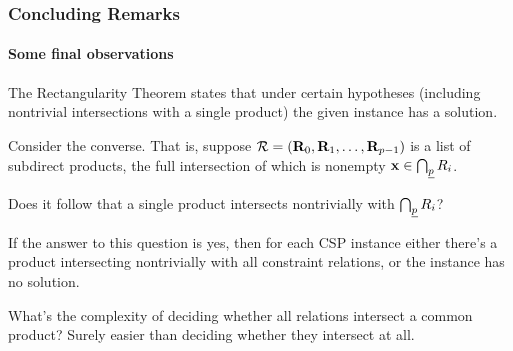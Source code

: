 \documentclass[xcolor=dvipsnames,9pt,hide notes,mathserif]{beamer}
\newcommand{\csp}{\acs{CSP}\xspace}
\begin{document}
\begin{frame} \frametitle{Concluding Remarks}
 \framesubtitle{Some final observations}

  The Rectangularity Theorem states that under certain hypotheses (including nontrivial
  intersections with a single \mas product) the given instance has a solution.

  \bigskip

  Consider the converse.  That is, suppose
  $\mathcal{R} = (\mathbf{R}_0, \mathbf{R}_1,\dots, \mathbf{R}_{p-1})$ is a list of subdirect products,
  the full intersection of which is nonempty $\mathbf{x} \in \bigcap_{\underline{p}} R_i$.
  
  \bigskip

  Does it follow that a single \mas product intersects nontrivially with
  $\bigcap_{\underline{p}} R_i$?

  \bigskip
  
  If the answer to this question is yes, then for each \csp instance either
  there's a \mas product intersecting nontrivially with 
  all constraint relations, or the instance has no solution.

  \bigskip
  What's the complexity of deciding whether all relations intersect a common
  \mas product?  Surely easier than deciding whether they intersect at all.

  \bigskip

  \begin{center}
  \end{center}
  
\end{frame}
\end{document}
